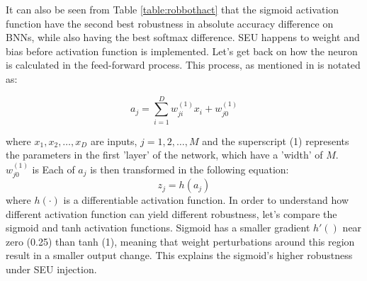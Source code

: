 It can also be seen from Table \ref{table:robbothact} that the sigmoid activation function have the second best robustness in absolute accuracy difference on BNNs, while also having the best softmax difference. SEU happens to weight and bias before activation function is implemented. Let's get back on how the neuron is calculated in the feed-forward process. This process, as mentioned in \cite{bishoppatternrecognition2007} is notated as:

\begin{equation}
\label{eq:neuronfeedforward}
a_j = \sum_{i=1}^{D} w^{(1)}_{ji} x_i + w^{(1)}_{j0}
\end{equation}

where $x_1,x_2,\dots,x_D$ are inputs, $j=1,2,\dots,M$ and the superscript (1) represents the parameters in the first 'layer' of the network, which have a 'width' of $M$. $w^{(1)}_{j0}$ is  Each of $a_j$ is then transformed in the following equation:
\begin{equation}
z_j = h(a_j)
\end{equation}
where $h(\cdot)$ is a differentiable activation function.
In order to understand how different activation function can yield different robustness, let's compare the sigmoid and tanh activation functions. Sigmoid has a smaller gradient $h'()$ near zero (0.25) than tanh (1), meaning that weight perturbations around this region result in a smaller output change. This explains the sigmoid's higher robustness under SEU injection.






